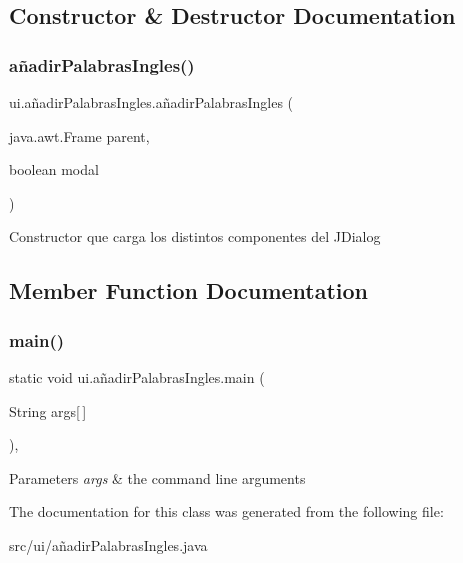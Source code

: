 \subsection{Constructor \& Destructor Documentation}
\mbox{\label{classui_1_1a_xC3_xB1adir_palabras_ingles_a239f989cb1d4499f24fb08a33e253a3b}} 
\subsubsection{\texorpdfstring{añadirPalabrasIngles()}{añadirPalabrasIngles()}}
{\footnotesize\ttfamily ui.\+añadir\+Palabras\+Ingles.\+añadir\+Palabras\+Ingles (\begin{DoxyParamCaption}\item[{java.\+awt.\+Frame}]{parent,  }\item[{boolean}]{modal }\end{DoxyParamCaption})\hspace{0.3cm}{\ttfamily [inline]}}

Constructor que carga los distintos componentes del J\+Dialog 

\subsection{Member Function Documentation}
\mbox{\label{classui_1_1a_xC3_xB1adir_palabras_ingles_ac0db1808f40d754978578112c0205f49}} 
\subsubsection{\texorpdfstring{main()}{main()}}
{\footnotesize\ttfamily static void ui.\+añadir\+Palabras\+Ingles.\+main (\begin{DoxyParamCaption}\item[{String}]{args\mbox{[}$\,$\mbox{]} }\end{DoxyParamCaption})\hspace{0.3cm}{\ttfamily [inline]}, {\ttfamily [static]}}


\begin{DoxyParams}{Parameters}
{\em args} & the command line arguments \\
\hline
\end{DoxyParams}


The documentation for this class was generated from the following file\+:\begin{DoxyCompactItemize}
\item 
src/ui/añadir\+Palabras\+Ingles.\+java\end{DoxyCompactItemize}
